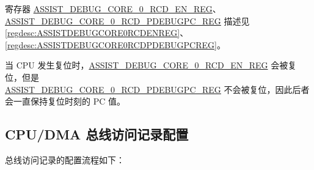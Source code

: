 \documentclass[main\_\_CN.tex]{subfiles}
\begin{document}
寄存器 \hyperref[regdesc:ASSISTDEBUGCORE0RCDENREG]{ASSIST\_DEBUG\_CORE\_0\_RCD\_EN\_REG}、\hyperref[regdesc:ASSISTDEBUGCORE0RCDPDEBUGPCREG]{ASSIST\_DEBUG\_CORE\_0\_RCD\_PDEBUGPC\_REG} 描述见 \ref{regdesc:ASSISTDEBUGCORE0RCDENREG}、\ref{regdesc:ASSISTDEBUGCORE0RCDPDEBUGPCREG}。

当 CPU 发生复位时，\hyperref[regdesc:ASSISTDEBUGCORE0RCDENREG]{ASSIST\_DEBUG\_CORE\_0\_RCD\_EN\_REG} 会被复位，但是\\ \hyperref[regdesc:ASSISTDEBUGCORE0RCDPDEBUGPCREG]{ASSIST\_DEBUG\_CORE\_0\_RCD\_PDEBUGPC\_REG} 不会被复位，因此后者会一直保持复位时刻的 PC 值。

\subsection{CPU/DMA 总线访问记录配置}
总线访问记录的配置流程如下：
\end{document}
